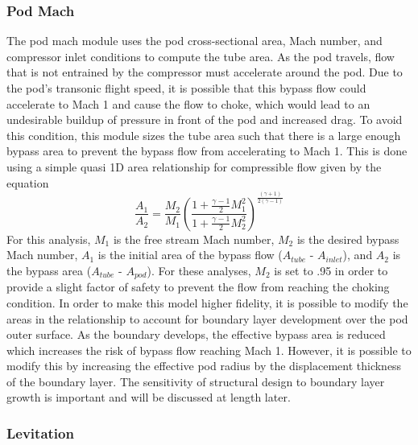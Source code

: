 \subsubsection{Pod Mach}
	The pod mach module uses the pod cross-sectional area, Mach number, and
	compressor inlet conditions to compute the tube area. As the pod travels,
	flow that is not entrained by the compressor must accelerate around the pod.
	Due to the pod’s transonic flight speed, it is possible that this bypass
	flow could accelerate to Mach 1 and cause the flow to choke, which would
	lead to an undesirable buildup of pressure in front of the pod and
	increased drag. To avoid this condition, this module sizes the tube area
	such that there is a large enough bypass area to prevent the bypass flow
	from accelerating to Mach 1. This is done using a simple quasi 1D area
	relationship for compressible flow given by the equation
	\begin{equation}
		\label{eq:mach_to_area}
		\frac{A_{1}}{A_{2}}=\frac{M_{2}}{M_{1}} \left( \frac{1+\frac{\gamma -1}{2}M_{1}^{2}}{1+\frac{\gamma -1}{2}M_{2}^{2}} \right)^{\frac{( \gamma +1 )}{2 ( \gamma -1  )}}
	\end{equation}
	For this analysis, $M_1$ is the free stream Mach number, $M_2$ is the
	desired bypass Mach number, $A_1$ is the initial area of the bypass flow
	($A_{tube}$ - $A_{inlet}$), and $A_2$ is the bypass area ($A_{tube}$ - $A_{pod}$).
	For these analyses, $M_2$ is set to .95 in order to provide a slight factor
	of safety to prevent the flow from reaching the choking condition.
	In order to make this model higher fidelity, it is possible to modify the
	areas in the relationship to account for boundary layer development over
	the pod outer surface. As the boundary develops, the effective bypass area
	is reduced which increases the risk of bypass flow reaching Mach 1. However,
	it is possible to modify this by increasing the effective pod radius by the
	displacement thickness of the boundary layer. The sensitivity of structural
	design to boundary layer growth is important and will be discussed at length later.
\subsubsection{Levitation}

